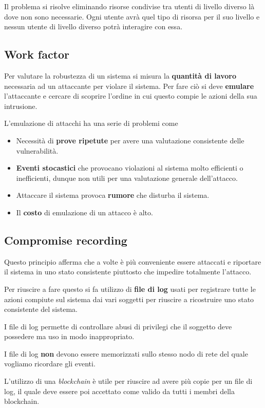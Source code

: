 Il problema si risolve eliminando risorse condivise tra utenti di livello diverso là dove non sono necessarie. Ogni
utente avrà quel tipo di risorsa per il suo livello e nessun utente di livello diverso potrà interagire con essa.

\subsection{Work factor}
Per valutare la robustezza di un sistema si misura la \textbf{quantità di lavoro} necessaria ad un attaccante per
violare il sistema. Per fare ciò si deve \textbf{emulare} l'attaccante e cercare di scoprire l'ordine in cui questo
compie le azioni della sua intrusione.

L'emulazione di attacchi ha una serie di problemi come
\begin{itemize}
	\item Necessità di \textbf{prove ripetute} per avere una valutazione consistente delle vulnerabilità.
	\item \textbf{Eventi stocastici} che provocano violazioni al sistema molto efficienti o inefficienti, dunque non
	      utili per una valutazione generale dell'attacco.
	\item Attaccare il sistema provoca \textbf{rumore} che disturba il sistema.
	\item Il \textbf{costo} di emulazione di un attacco è alto.
\end{itemize}

\subsection{Compromise recording}
Questo principio afferma che a volte è più conveniente essere attaccati e riportare il sistema in uno stato
consistente piuttosto che impedire totalmente l'attacco.

Per riuscire a fare questo si fa utilizzo di \textbf{file di log} usati per registrare tutte le azioni compiute sul
sistema dai vari soggetti per riuscire a ricostruire uno stato consistente del sistema.

I file di log permette di controllare abusi di privilegi che il soggetto deve possedere ma uso in modo inappropriato.

I file di log \textbf{non} devono essere memorizzati sullo stesso nodo di rete del quale vogliamo ricordare gli
eventi.

L'utilizzo di una \emph{blockchain} è utile per riuscire ad avere più copie per un file di log, il quale deve essere
poi accettato come valido da tutti i membri della blockchain.

